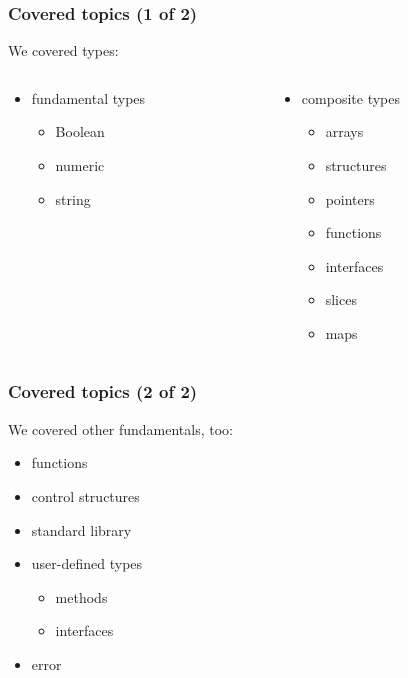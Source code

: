 \begin{frame}[t]
  \frametitle{Covered topics (1 of 2)}

  We covered types:

  \begin{columns}[T]
    \begin{column}{0.5\linewidth}
      \begin{itemize}
      \item fundamental types
        \begin{itemize}
        \item Boolean
        \item numeric
        \item string
        \end{itemize}
      \end{itemize}
    \end{column}
    \begin{column}{0.5\linewidth}
      \begin{itemize}
      \item composite types
        \begin{itemize}
        \item arrays
        \item structures
        \item pointers
        \item functions
        \item interfaces
        \item slices
        \item maps
        \end{itemize}
      \end{itemize}
    \end{column}
  \end{columns}
\end{frame}

\begin{frame}[t]
  \frametitle{Covered topics (2 of 2)}

  We covered other fundamentals, too:

  \begin{itemize}
  \item functions
  \item control structures
  \item standard library
  \item user-defined types

    \begin{itemize}
    \item methods
    \item interfaces
    \end{itemize}
  \item error
  \end{itemize}
\end{frame}

